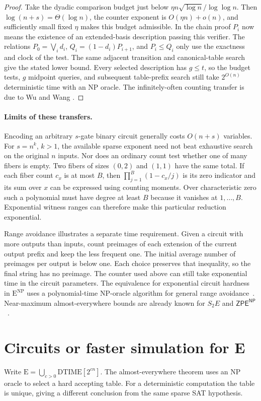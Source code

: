 \documentclass[12pt,letterpaper]{article}
\newcommand{\ENP}{\mathrm{E}^{\mathrm{NP}}}
\begin{document}
\begin{proof}
Take the dyadic comparison budget just below
$\eta n\sqrt{\log n}/\log\log n$. Then $\log(n+s)=\Theta(\log n)$,
the counter exponent is $O(\eta n)+o(n)$, and sufficiently small
fixed $\eta$ makes this budget admissible. In the chain proof $P_i$
now means the existence of an extended-basis description passing
this verifier. The relations $P_0=\bigvee_i d_i$,
$Q_i=(1-d_i)P_{i+1}$, and $P_i\le Q_i$ only use the exactness and
clock of the test. The same adjacent transition and canonical-table
search give the stated lower bound. Every selected description has
$g\le t$, so the budget tests, $g$ midpoint queries, and subsequent
table-prefix search still take $2^{O(n)}$ deterministic time with
an NP oracle. The infinitely-often counting transfer is due to Wu
and Wang \cite[Theorem~1]{wuwang}.
\end{proof}

\paragraph{Limits of these transfers.}
Encoding an arbitrary $s$-gate binary circuit generally costs
$O(n+s)$ variables. For $s=n^k$, $k>1$, the available sparse exponent
need not beat exhaustive search on the original $n$ inputs. Nor does
an ordinary count test whether one of many fibers is empty. Two fibers
of sizes $(0,2)$ and $(1,1)$ have the same total. If each fiber count
$c_x$ is at most $B$, then $\prod_{j=1}^B(1-c_x/j)$ is its zero
indicator and its sum over $x$ can be expressed using counting moments.
Over characteristic zero such a polynomial must have degree at least
$B$ because it vanishes at $1,\ldots,B$. Exponential witness ranges
can therefore make this particular reduction exponential.

Range avoidance illustrates a separate time requirement. Given a circuit
with more outputs than inputs, count preimages of each extension of the
current output prefix and keep the less frequent one. The initial
average number of preimages per output is below one. Each choice
preserves that inequality, so the final string has no preimage.
The counter used above can still take exponential time in the circuit
parameters. The equivalence for exponential circuit hardness in
$\ENP$ uses a polynomial-time NP-oracle algorithm for general range
avoidance~\cite{avoid}. Near-maximum almost-everywhere bounds are
already known for $S_2E$ and $\mathsf{ZPE}^{\mathsf{NP}}$~\cite{li}.

\section{Circuits or faster simulation for E}\label{sec:deterministic}
Write $\mathrm E=\bigcup_{c>0}\mathrm{DTIME}[2^{cn}]$. The
almost-everywhere theorem uses an NP oracle to select a hard accepting
table. For a deterministic computation the table is unique, giving a
different conclusion from the same sparse SAT hypothesis.
\end{document}
